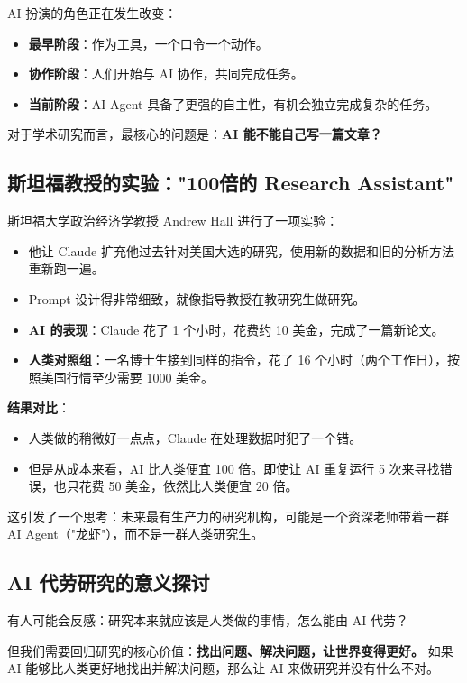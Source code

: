 \documentclass[12pt,a4paper]{article}
\begin{document}
AI 扮演的角色正在发生改变：
\begin{itemize}[leftmargin=2em]
  \item \textbf{最早阶段}：作为工具，一个口令一个动作。
  \item \textbf{协作阶段}：人们开始与 AI 协作，共同完成任务。
  \item \textbf{当前阶段}：AI Agent 具备了更强的自主性，有机会独立完成复杂的任务。
\end{itemize}

对于学术研究而言，最核心的问题是：\textbf{AI 能不能自己写一篇文章？}

\subsection{斯坦福教授的实验："100倍的 Research Assistant"}

斯坦福大学政治经济学教授 Andrew Hall 进行了一项实验：
\begin{itemize}[leftmargin=2em]
  \item 他让 Claude 扩充他过去针对美国大选的研究，使用新的数据和旧的分析方法重新跑一遍。
  \item Prompt 设计得非常细致，就像指导教授在教研究生做研究。
  \item \textbf{AI 的表现}：Claude 花了 1 个小时，花费约 10 美金，完成了一篇新论文。
  \item \textbf{人类对照组}：一名博士生接到同样的指令，花了 16 个小时（两个工作日），按照美国行情至少需要 1000 美金。
\end{itemize}

\textbf{结果对比}：
\begin{itemize}[leftmargin=2em]
  \item 人类做的稍微好一点点，Claude 在处理数据时犯了一个错。
  \item 但是从成本来看，AI 比人类便宜 100 倍。即使让 AI 重复运行 5 次来寻找错误，也只花费 50 美金，依然比人类便宜 20 倍。
\end{itemize}

这引发了一个思考：未来最有生产力的研究机构，可能是一个资深老师带着一群 AI Agent（"龙虾"），而不是一群人类研究生。

\subsection{AI 代劳研究的意义探讨}

有人可能会反感：研究本来就应该是人类做的事情，怎么能由 AI 代劳？

但我们需要回归研究的核心价值：\textbf{找出问题、解决问题，让世界变得更好。}
如果 AI 能够比人类更好地找出并解决问题，那么让 AI 来做研究并没有什么不对。
\end{document}
